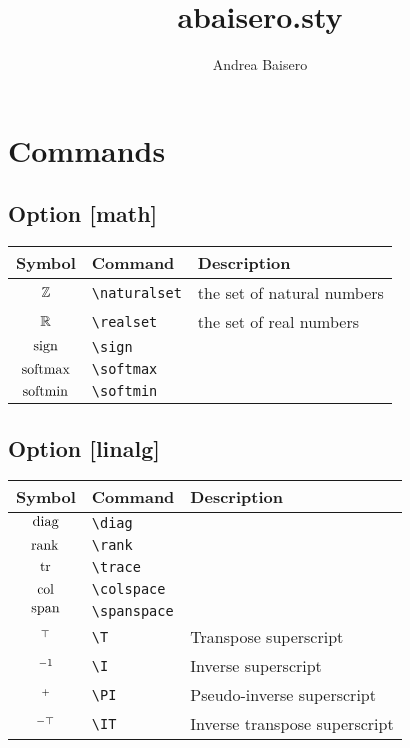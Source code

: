 \documentclass{article}
\begin{document}
\title{abaisero.sty}
\author{Andrea Baisero}

\newcommand\command[1]{\texttt{\textbackslash{#1}}}

\maketitle

\section{Commands}

\subsection*{Option [math]}

\begin{tabular}{cll}
  \toprule
  Symbol & Command & Description \\
  \midrule
  $\mathbb{Z}$ & \command{naturalset} & the set of natural numbers \\
  $\mathbb{R}$ & \command{realset} & the set of real numbers \\
  $\operatorname*{sign}$ & \command{sign} & \\
  $\operatorname*{softmax}$ & \command{softmax} & \\
  $\operatorname*{softmin}$ & \command{softmin} & \\
  \bottomrule
\end{tabular}

\subsection*{Option [linalg]}

\begin{tabular}{cll}
  \toprule
  Symbol & Command & Description \\
  \midrule
  $\operatorname*{diag}$ & \command{diag} & \\
  $\operatorname*{rank}$ & \command{rank} & \\
  $\operatorname*{tr}$ & \command{trace} & \\
  $\operatorname*{col}$ & \command{colspace} & \\
  $\operatorname*{span}$ & \command{spanspace} & \\
  $^\top$ & \command{T} & Transpose superscript \\
  $^{-1}$ & \command{I} & Inverse superscript \\
  $^{+}$ & \command{PI} & Pseudo-inverse superscript \\
  $^{-\top}$ & \command{IT} & Inverse transpose superscript \\
  \bottomrule
\end{tabular}
\end{document}
